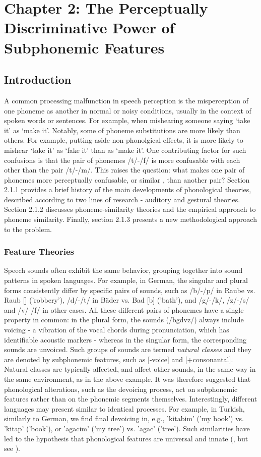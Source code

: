 \chapter{Chapter 2: The Perceptually Discriminative Power of Subphonemic Features}
\section{Introduction}
A common processing malfunction in speech perception is the misperception of one phoneme as another in normal or noisy conditions, usually in the context of spoken words or sentences. For example, when mishearing someone saying ‘take it’ as ‘make it’. Notably, some of phoneme substitutions are more likely than others. For example, putting aside non-phonolgical effects, it is more likely to mishear ‘take it’ as ‘fake it’ than as ‘make it’. One contributing factor for such confusions is that the pair of phonemes /t/-/f/ is more confusable with each other than the pair /t/-/m/. This raises the question: what makes one pair of phonemes more perceptually confusable, or similar \citep{Tversky1977, Shepard1987}, than another pair? Section 2.1.1 provides a brief history of the main developments of phonological theories, described according to two lines of research - auditory and gestural theories. Section 2.1.2 discusses phoneme-similarity theories and the empirical approach to phoneme similarity. Finally, section 2.1.3 presents a new methodological approach to the problem.  

\subsection{Feature Theories}
Speech sounds often exhibit the same behavior, grouping together into sound patterns in spoken languages. For example, in German, the singular and plural forms consistently differ by specific pairs of sounds, such as /b/-/p/ in Raube vs. Raub [] ('robbery'), /d/-/t/ in  Bäder  vs. Bad [b] ('bath'), and /g/-/k/, /z/-/s/ and /v/-/f/ in other cases. All these different pairs of phonemes have a single property in common: in the plural form, the sounds (/bgdvz/) always include voicing - a vibration of the vocal chords during pronunciation, which has identifiable acoustic markers - whereas in the singular form, the corresponding sounds are unvoiced. Such groups of sounds are termed \textit{natural classes} and they are denoted by subphonemic features, such as [-voice] and [+consonantal]. Natural classes are typically affected, and affect other sounds, in the same way in the same environment, as in the above example. It was therefore suggested that phonological alterations, such as the devoicing process, act on subphonemic features rather than on the phonemic segments themselves. Interestingly, different languages may present similar to identical processes. For example, in Turkish, similarly to German, we find final devoicing in, e.g., 'kitabim' ('my book') vs. 'kitap' ('book'), or 'agacim' ('my tree') vs. 'agac' ('tree'). Such similarities have led to the hypothesis that phonological features are universal and innate (\citealp{ChomskyHalle1968}, but see \citealp{mielke2008emergence}).

